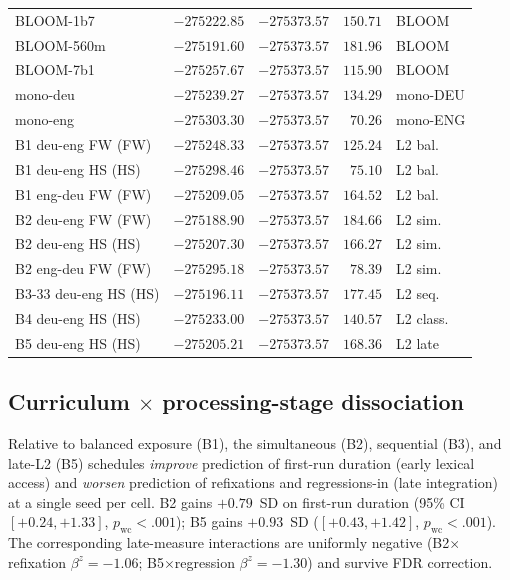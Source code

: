 \begin{table}[!ht]
\begin{tabular}{lrrrl}
    BLOOM-1b7 & $-275222.85$ & $-275373.57$ & $150.71$ & BLOOM \\
    BLOOM-560m & $-275191.60$ & $-275373.57$ & $181.96$ & BLOOM \\
    BLOOM-7b1 & $-275257.67$ & $-275373.57$ & $115.90$ & BLOOM \\
    mono-deu & $-275239.27$ & $-275373.57$ & $134.29$ & mono-DEU \\
    mono-eng & $-275303.30$ & $-275373.57$ & $70.26$ & mono-ENG \\
    B1 deu-eng FW (FW) & $-275248.33$ & $-275373.57$ & $125.24$ & L2 bal. \\
    B1 deu-eng HS (HS) & $-275298.46$ & $-275373.57$ & $75.10$ & L2 bal. \\
    B1 eng-deu FW (FW) & $-275209.05$ & $-275373.57$ & $164.52$ & L2 bal. \\
    B2 deu-eng FW (FW) & $-275188.90$ & $-275373.57$ & $184.66$ & L2 sim. \\
    B2 deu-eng HS (HS) & $-275207.30$ & $-275373.57$ & $166.27$ & L2 sim. \\
    B2 eng-deu FW (FW) & $-275295.18$ & $-275373.57$ & $78.39$ & L2 sim. \\
    B3-33 deu-eng HS (HS) & $-275196.11$ & $-275373.57$ & $177.45$ & L2 seq. \\
    B4 deu-eng HS (HS) & $-275233.00$ & $-275373.57$ & $140.57$ & L2 class. \\
    B5 deu-eng HS (HS) & $-275205.21$ & $-275373.57$ & $168.36$ & L2 late \\
    \bottomrule
  \end{tabular}
\end{table}



\subsection{Curriculum $\times$ processing-stage dissociation}\label{sec:reading-time-stage-app}

Relative to balanced exposure (B1), the simultaneous (B2), sequential (B3), and late-L2 (B5) schedules \emph{improve} prediction of first-run duration (early lexical access) and \emph{worsen} prediction of refixations and regressions-in (late integration) at a single seed per cell. B2 gains $+0.79$~SD on first-run duration (95\% CI $[+0.24, +1.33]$, $p_{\mathrm{wc}}{<}.001$); B5 gains $+0.93$~SD ($[+0.43, +1.42]$, $p_{\mathrm{wc}}{<}.001$). The corresponding late-measure interactions are uniformly negative (B2$\times$refixation $\beta^{z}{=}{-}1.06$; B5$\times$regression $\beta^{z}{=}{-}1.30$) and survive FDR correction.

